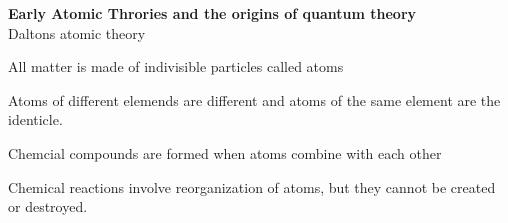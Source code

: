 \documentclass{article}
\begin{document}
\textbf{Early Atomic Throries and the origins of quantum theory}
\\
Daltons atomic theory

All matter is made of indivisible particles called atoms

Atoms of different elemends are different and atoms of the same element are the identicle.

Chemcial compounds are formed when atoms combine with each other

Chemical reactions involve reorganization of atoms, but they cannot be created or destroyed.
\end{document}
